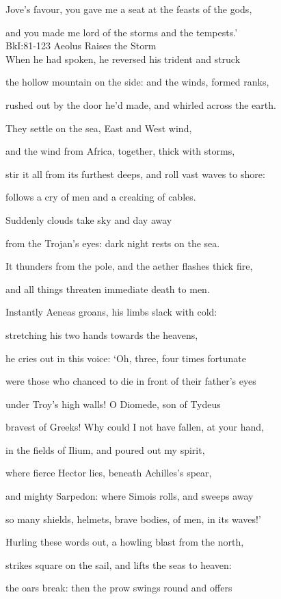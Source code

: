 \documentclass[12pt, a5paper, titlepage]{letter}
\begin{document}
Jove’s favour, you gave me a seat at the feasts of the gods,

and you made me lord of the storms and the tempests.’ \\

BkI:81-123 Aeolus Raises the Storm \\

When he had spoken, he reversed his trident and struck

the hollow mountain on the side: and the winds, formed ranks,

rushed out by the door he’d made, and whirled across the earth.

They settle on the sea, East and West wind,

and the wind from Africa, together, thick with storms,

stir it all from its furthest deeps, and roll vast waves to shore:

follows a cry of men and a creaking of cables.

Suddenly clouds take sky and day away

from the Trojan’s eyes: dark night rests on the sea.

It thunders from the pole, and the aether flashes thick fire,

and all things threaten immediate death to men.

Instantly Aeneas groans, his limbs slack with cold:

stretching his two hands towards the heavens,

he cries out in this voice: ‘Oh, three, four times fortunate

were those who chanced to die in front of their father’s eyes

under Troy’s high walls! O Diomede, son of Tydeus

bravest of Greeks! Why could I not have fallen, at your hand,

in the fields of Ilium, and poured out my spirit,

where fierce Hector lies, beneath Achilles’s spear,

and mighty Sarpedon: where Simois rolls, and sweeps away

so many shields, helmets, brave bodies, of men, in its waves!’

Hurling these words out, a howling blast from the north,

strikes square on the sail, and lifts the seas to heaven:

the oars break: then the prow swings round and offers
\end{document}
